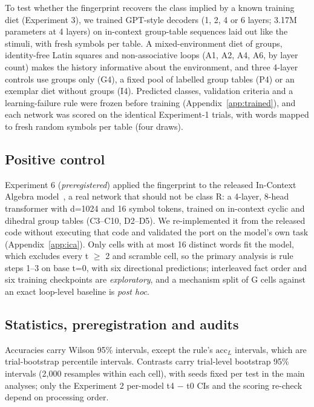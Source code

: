 \documentclass[11pt]{article}
\begin{document}
To test whether the fingerprint recovers the class implied by a known training diet (Experiment 3), we trained GPT-style decoders (1, 2, 4 or 6 layers; 3.17M parameters at 4 layers) on in-context group-table sequences laid out like the stimuli, with fresh symbols per table. A mixed-environment diet of groups, identity-free Latin squares and non-associative loops (A1, A2, A4, A6, by layer count) makes the history informative about the environment, and three 4-layer controls use groups only (G4), a fixed pool of labelled group tables (P4) or an exemplar diet without groups (I4). Predicted classes, validation criteria and a learning-failure rule were frozen before training (Appendix~\ref{app:trained}), and each network was scored on the identical Experiment-1 trials, with words mapped to fresh random symbols per table (four draws).

\subsection{Positive control}\label{sec:ica}

Experiment 6 (\emph{preregistered}) applied the fingerprint to the released In-Context Algebra model~\cite{todd2026ica}, a real network that should not be class R: a 4-layer, 8-head transformer with d=1024 and 16 symbol tokens, trained on in-context cyclic and dihedral group tables (C3--C10, D2--D5). We re-implemented it from the released code without executing that code and validated the port on the model's own task (Appendix~\ref{app:ica}). Only cells with at most 16 distinct words fit the model, which excludes every t $\geq$ 2 and scramble cell, so the primary analysis is rule steps 1--3 on base t=0, with six directional predictions; interleaved fact order and six training checkpoints are \emph{exploratory}, and a mechanism split of G cells against an exact loop-level baseline is \emph{post hoc}.

\subsection{Statistics, preregistration and audits}\label{sec:stats}

Accuracies carry Wilson 95\% intervals, except the rule's $\mathrm{acc}_L$ intervals, which are trial-bootstrap percentile intervals. Contrasts carry trial-level bootstrap 95\% intervals (2,000 resamples within each cell), with seeds fixed per test in the main analyses; only the Experiment 2 per-model t4 $-$ t0 CIs and the scoring re-check depend on processing order.
\end{document}

